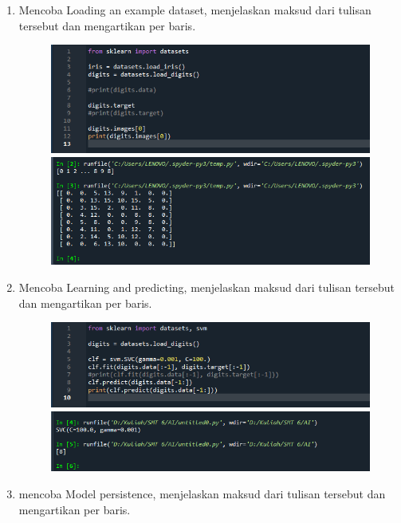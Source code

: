 \begin{enumerate}
\item
Mencoba Loading an example dataset, menjelaskan maksud dari tulisan tersebut dan mengartikan per baris.
		\begin{figure}[!htbp]
			\centering
			\includegraphics[scale=0.4]{figures/2.1.PNG}
			\includegraphics[scale=0.5]{figures/2.2.PNG}
		\end{figure}
\newpage
\item
Mencoba Learning and predicting, menjelaskan maksud dari tulisan tersebut dan mengartikan per baris.
		\begin{figure}[!htbp]
			\centering
			\includegraphics[scale=0.4]{figures/3.1.PNG}
			\includegraphics[scale=0.5]{figures/3.2.PNG}
		\end{figure}
\item
mencoba Model persistence, menjelaskan maksud dari tulisan tersebut dan mengartikan per baris.
		\begin{figure}[!htbp]
			\centering

\end{figure}
\end{enumerate}
